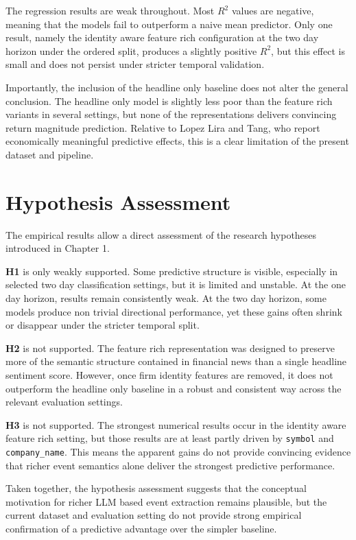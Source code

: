 The regression results are weak throughout. Most $R^2$ values are negative, meaning that the models fail to outperform a naive mean predictor. Only one result, namely the identity aware feature rich configuration at the two day horizon under the ordered split, produces a slightly positive $R^2$, but this effect is small and does not persist under stricter temporal validation.

Importantly, the inclusion of the headline only baseline does not alter the general conclusion. The headline only model is slightly less poor than the feature rich variants in several settings, but none of the representations delivers convincing return magnitude prediction. Relative to Lopez Lira and Tang, who report economically meaningful predictive effects, this is a clear limitation of the present dataset and pipeline.

\section{Hypothesis Assessment}

The empirical results allow a direct assessment of the research hypotheses introduced in Chapter 1.

\textbf{H1} is only weakly supported. Some predictive structure is visible, especially in selected two day classification settings, but it is limited and unstable. At the one day horizon, results remain consistently weak. At the two day horizon, some models produce non trivial directional performance, yet these gains often shrink or disappear under the stricter temporal split.

\textbf{H2} is not supported. The feature rich representation was designed to preserve more of the semantic structure contained in financial news than a single headline sentiment score. However, once firm identity features are removed, it does not outperform the headline only baseline in a robust and consistent way across the relevant evaluation settings.

\textbf{H3} is not supported. The strongest numerical results occur in the identity aware feature rich setting, but those results are at least partly driven by \texttt{symbol} and \texttt{company\_name}. This means the apparent gains do not provide convincing evidence that richer event semantics alone deliver the strongest predictive performance.

Taken together, the hypothesis assessment suggests that the conceptual motivation for richer LLM based event extraction remains plausible, but the current dataset and evaluation setting do not provide strong empirical confirmation of a predictive advantage over the simpler baseline.

